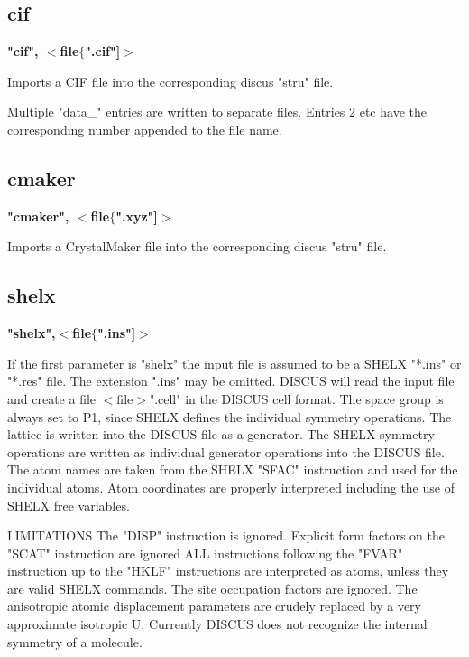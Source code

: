 \subsection*{cif}
{\bf "cif", $ <$file$ \{$".cif"]$> $ \par }
\par
\vspace{3pt}
Imports a CIF file into the corresponding discus "stru" file. 
\par
Multiple "data\_" entries are written to separate files. 
Entries 2 etc have the corresponding number appended to the 
file name. 
\subsection*{cmaker}
{\bf "cmaker", $ <$file$ \{$".xyz"]$> $ \par }
\par
\vspace{3pt}
Imports a CrystalMaker file into the corresponding discus "stru" file. 
\subsection*{shelx}
{\bf "shelx",$ <$file$ \{$".ins"]$> $ \par }
\par
\vspace{3pt}
If the first parameter is "shelx" the input file is assumed to be a 
SHELX "*.ins" or "*.res" file. The extension ".ins" may be omitted. 
DISCUS will read the input file and create a file $ <$file$> $".cell" in 
the DISCUS cell format. 
The space group is always set to P1, since SHELX defines the individual 
symmetry operations. 
The lattice is written into the DISCUS file as a generator. 
The SHELX symmetry operations are written as individual generator operations 
into the DISCUS file. 
The atom names are taken from the SHELX "SFAC" instruction and used for 
the individual atoms. 
Atom coordinates are properly interpreted including the use of SHELX free 
variables. 
\par
LIMITATIONS 
The "DISP" instruction is ignored. 
Explicit form factors on the "SCAT" instruction are ignored 
ALL instructions following the "FVAR" instruction up to the "HKLF" 
instructions are interpreted as atoms, unless they are valid SHELX 
commands. 
The site occupation factors are ignored. 
The anisotropic atomic displacement parameters are crudely replaced 
by a very approximate isotropic U. 
Currently DISCUS does not recognize the internal symmetry of a molecule. 

